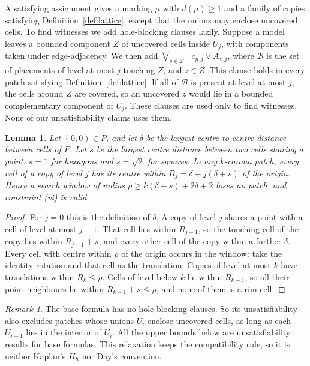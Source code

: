 \documentclass[11pt]{amsart}
\newtheorem{lemma}[theorem]{Lemma}
\theoremstyle{definition}
\theoremstyle{remark}
\newtheorem{remark}[theorem]{Remark}
\begin{document}
A satisfying assignment gives a marking $\mu$ with $d(\mu)\ge1$ and a family of copies satisfying Definition~\ref{def:lattice}, except that the unions may enclose uncovered cells. To find witnesses we add hole-blocking clauses lazily. Suppose a model leaves a bounded component $Z$ of uncovered cells inside $U_j$, with components taken under edge-adjacency. We then add $\bigvee_{p\in\mathcal B}\neg c_{p,j}\vee A_{z,j}$, where $\mathcal B$ is the set of placements of level at most $j$ touching $Z$, and $z\in Z$. This clause holds in every patch satisfying Definition~\ref{def:lattice}. If all of $\mathcal B$ is present at level at most $j$, the cells around $Z$ are covered, so an uncovered $z$ would lie in a bounded complementary component of $U_j$. These clauses are used only to find witnesses. None of our unsatisfiability claims uses them.

\begin{lemma}\label{lem:radius}
Let $(0,0)\in P$, and let $\delta$ be the largest centre-to-centre distance between cells of $P$. Let $s$ be the largest centre distance between two cells sharing a point: $s=1$ for hexagons and $s=\sqrt2$ for squares. In any $k$-corona patch, every cell of a copy of level $j$ has its centre within $R_j=\delta+j(\delta+s)$ of the origin. Hence a search window of radius $\rho\ge k(\delta+s)+2\delta+2$ loses no patch, and constraint (vi) is valid.
\end{lemma}
\begin{proof}
For $j=0$ this is the definition of $\delta$. A copy of level $j$ shares a point with a cell of level at most $j-1$. That cell lies within $R_{j-1}$, so the touching cell of the copy lies within $R_{j-1}+s$, and every other cell of the copy within a further $\delta$. Every cell with centre within $\rho$ of the origin occurs in the window: take the identity rotation and that cell as the translation. Copies of level at most $k$ have translations within $R_k\le\rho$. Cells of level below $k$ lie within $R_{k-1}$, so all their point-neighbours lie within $R_{k-1}+s\le\rho$, and none of them is a rim cell.
\end{proof}

\begin{remark}\label{rem:holes}
The base formula has no hole-blocking clauses. So its unsatisfiability also excludes patches whose unions $U_i$ enclose uncovered cells, as long as each $U_{i-1}$ lies in the interior of $U_i$. All the upper bounds below are unsatisfiability results for base formulas. This relaxation keeps the compatibility rule, so it is neither Kaplan's $H_h$ nor Day's convention.
\end{remark}
\end{document}
